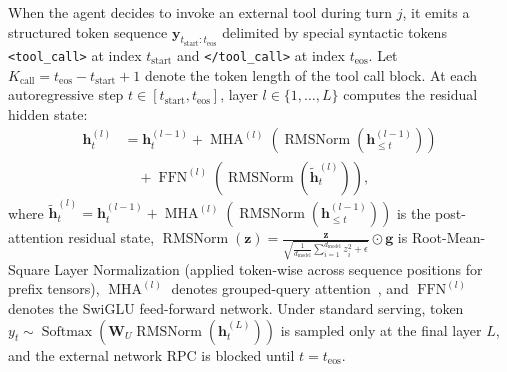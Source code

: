 \documentclass[10pt,conference]{IEEEtran}
\begin{document}
When the agent decides to invoke an external tool during turn $j$, it emits a structured token sequence $\mathbf{y}_{t_{\text{start}} : t_{\text{eos}}}$ delimited by special syntactic tokens \texttt{<tool\_call>} at index $t_{\text{start}}$ and \texttt{</tool\_call>} at index $t_{\text{eos}}$. Let $K_{\text{call}} = t_{\text{eos}} - t_{\text{start}} + 1$ denote the token length of the tool call block. At each autoregressive step $t \in [t_{\text{start}}, t_{\text{eos}}]$, layer $l \in \{1, \dots, L\}$ computes the residual hidden state:
\begin{equation}
\begin{aligned}
\mathbf{h}_t^{(l)} &= \mathbf{h}_t^{(l-1)} + \operatorname{MHA}^{(l)}\!\left(\operatorname{RMSNorm}\!\left(\mathbf{h}_{\le t}^{(l-1)}\right)\right) \\
&\quad + \operatorname{FFN}^{(l)}\!\left(\operatorname{RMSNorm}\!\left(\tilde{\mathbf{h}}_t^{(l)}\right)\right),
\end{aligned}
\label{eq:residual_stream}
\end{equation}
where $\tilde{\mathbf{h}}_t^{(l)} = \mathbf{h}_t^{(l-1)} + \operatorname{MHA}^{(l)}(\operatorname{RMSNorm}(\mathbf{h}_{\le t}^{(l-1)}))$ is the post-attention residual state, $\operatorname{RMSNorm}(\mathbf{z}) = \frac{\mathbf{z}}{\sqrt{\frac{1}{d_{\text{model}}}\sum_{i=1}^{d_{\text{model}}} z_i^2 + \epsilon}} \odot \mathbf{g}$ is Root-Mean-Square Layer Normalization (applied token-wise across sequence positions for prefix tensors), $\operatorname{MHA}^{(l)}$ denotes grouped-query attention~\cite{vaswani2017attention, dao2022flashattention, dao2024flashattention2}, and $\operatorname{FFN}^{(l)}$ denotes the SwiGLU feed-forward network. Under standard serving, token $y_t \sim \operatorname{Softmax}(\mathbf{W}_U \operatorname{RMSNorm}(\mathbf{h}_t^{(L)}))$ is sampled only at the final layer $L$, and the external network RPC is blocked until $t = t_{\text{eos}}$.
\end{document}
